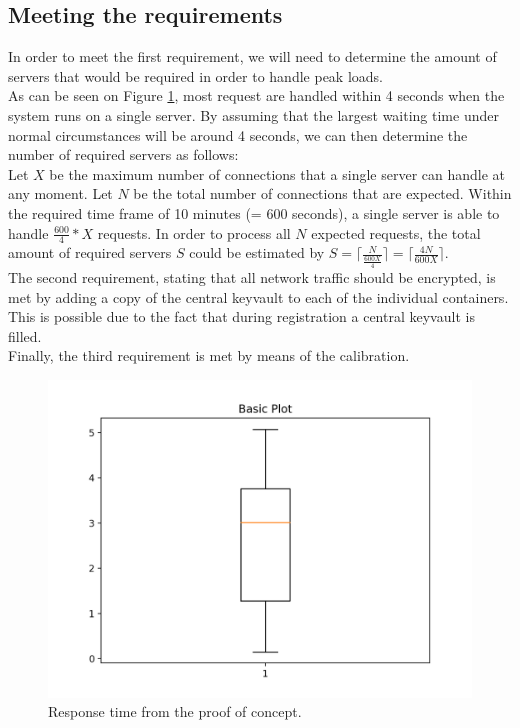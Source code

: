 \documentclass[10pt,a4paper,twocolumn]{article}
\begin{document}
\subsection{Meeting the requirements}
In order to meet the first requirement, we will need to determine the amount of servers that would be required in order to handle peak loads. \\
As can be seen on Figure \ref{proofofconcept:boxplot}, most request are handled within 4 seconds when the system runs on a single server. By assuming that the largest waiting time under normal circumstances will be around 4 seconds, we can then determine the number of required servers as follows:\\
\indent Let $X$ be the maximum number of connections that a single server can handle at any moment. Let $N$ be the total number of connections that are expected. Within the required time frame of 10 minutes (= 600 seconds), a single server is able to handle $\frac{600}{4}*X$ requests. In order to process all $N$ expected requests, the total amount of required servers $S$ could be estimated by $S = \lceil \frac{N}{\frac{600X}{4}} \rceil = \lceil \frac{4N}{600X} \rceil$.\\
The second requirement, stating that all network traffic should be encrypted, is met by adding a copy of the central keyvault to each of the individual containers. This is possible due to the fact that during registration a central keyvault is filled.\\
Finally, the third requirement is met by means of the calibration.

\begin{figure}[h]
	\includegraphics[scale=0.5]{boxplot.png}
	\caption{\label{proofofconcept:boxplot}Response time from the proof of concept.}
	
\end{figure}
\end{document}
